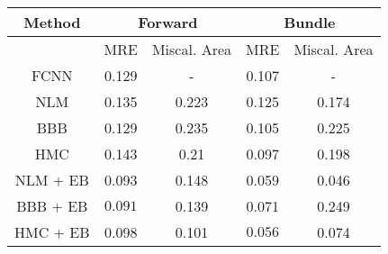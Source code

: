 \documentclass[convert={outext=.png}]{standalone}
\begin{document}
\begin{tabular}{c c c c c}
\hline
\hline
Method &  \multicolumn{2}{c}{Forward} & \multicolumn{2}{c}{Bundle} \\ \hline
 & MRE & Miscal. Area & MRE & Miscal. Area \\
 FCNN & 0.129 & - & 0.107 & - \\
 \hline
 NLM & 0.135 & 0.223 & 0.125 & 0.174 \\
 BBB & 0.129 & 0.235 & 0.105 & 0.225 \\
 HMC & 0.143 & 0.21 & 0.097 & 0.198 \\
 \hline
 NLM + EB & 0.093 & 0.148 & 0.059 & 0.046 \\
 BBB + EB & $\mathbf{0.091}$ & 0.139 & 0.071 & 0.249 \\
 HMC + EB & 0.098 & 0.101 & $\mathbf{0.056}$ & 0.074 \\
\hline
\hline
\end{tabular}
\end{document}
